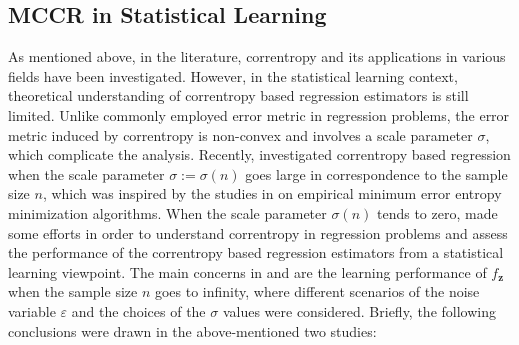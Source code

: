 \documentclass[11pt]{article}
\begin{document}
\subsection{MCCR in Statistical Learning} 
As mentioned above, in the literature, correntropy and its applications in various fields have been investigated. However, in the statistical learning context, theoretical understanding of correntropy based regression estimators is still limited. Unlike commonly employed error metric in regression problems, the error metric induced by correntropy is non-convex and involves a scale parameter $\sigma$, which complicate the analysis. Recently, \cite{fenglearning} investigated correntropy based regression when the scale parameter $\sigma:=\sigma(n)$ goes large in correspondence to the sample size $n$, which was inspired by the studies in  \cite{hu2013learning,fan2014consistency} on empirical minimum error entropy minimization algorithms. When the scale parameter $\sigma(n)$ tends to zero, \cite{feng2017statistical} made some efforts in order to understand correntropy in regression problems and assess the performance of the correntropy based regression estimators from a statistical learning viewpoint. The main concerns in \cite{fenglearning} and \cite{feng2017statistical} are the learning performance of $f_\mathbf{z}$ when the sample size $n$ goes to infinity, where different scenarios of the noise variable $\varepsilon$ and the choices of the  $\sigma$ values were considered. Briefly, the following conclusions were drawn in the above-mentioned two studies:
\end{document}
